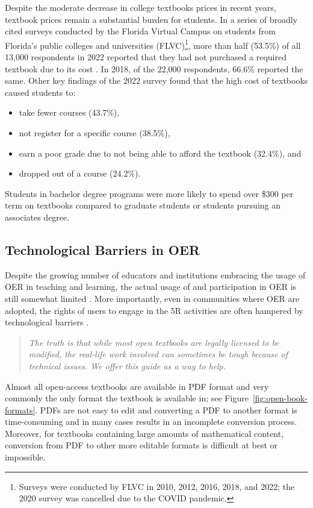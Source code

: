 \documentclass[11pt]{article}
\begin{document}
Despite the moderate decrease in college textbooks prices in recent years, textbook prices remain a substantial burden for students.  In a series of broadly cited surveys conducted by the Florida Virtual Campus on students from Florida's public colleges and universities (FLVC)\footnote{Surveys were conducted by FLVC in 2010, 2012, 2016, 2018, and 2022; the 2020 survey was cancelled due to the COVID pandemic.}, more than half (53.5\%) of all 13,000 respondents in 2022 reported that they had not purchased a required textbook due to its cost \cite{flvc2022}. In 2018, of the 22,000 respondents, 66.6\% reported the same.  Other key findings of the 2022 survey found that the high cost of textbooks caused students to:
\begin{itemize}
\item take fewer courses (43.7\%),
\item not register for a specific course (38.5\%),
\item earn a poor grade due to not being able to afford the textbook (32.4\%), and
\item dropped out of a course (24.2\%).
\end{itemize}
Students in bachelor degree programs were more likely to spend over \$300 per term on textbooks compared to graduate students or students pursuing an associates degree.

\subsection{Technological Barriers in OER}
Despite the growing number of educators and institutions embracing the usage of OER in teaching and learning, the actual usage of and participation in OER is still somewhat limited \cite{MB:2022}.  More importantly, even in communities where OER are adopted, the rights of users to engage in the 5R activities are often hampered by technological barriers \cite{SO:19}.
\begin{quote}\em
  The truth is that while most open textbooks are legally licensed to be modified, the real-life work involved can sometimes be tough because of technical issues. We offer this guide as a way to help. \cite{CC:16}
\end{quote}
Almost all open-access textbooks are available in PDF format and very commonly the only format the textbook is available in; see Figure~\ref{fig:open-book-formats}.  PDFs are not easy to edit and converting a PDF to another format is time-consuming and in many cases results in an incomplete conversion process.  Moreover, for textbooks containing large amounts of mathematical content, conversion from PDF to other more editable formats is difficult at best or impossible.
\end{document}
